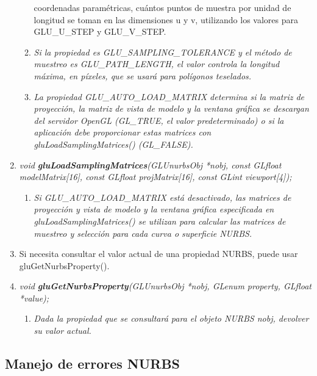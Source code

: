 \begin{enumerate}
\begin{enumerate}
{            coordenadas paramétricas, cuántos puntos de muestra por
            unidad de longitud se toman en las dimensiones u y v,
            utilizando los valores para GLU\_U\_STEP y GLU\_V\_STEP.
        }
        \item[] \textit{Si la propiedad es GLU\_SAMPLING\_TOLERANCE
            y el método de muestreo es GLU\_PATH\_LENGTH, el valor
            controla la longitud máxima, en píxeles, que se usará
            para polígonos teselados.
        }
        \item[] \textit{La propiedad GLU\_AUTO\_LOAD\_MATRIX determina
            si la matriz de proyección, la matriz de vista de modelo
            y la ventana gráfica se descargan del servidor OpenGL
            (GL\_TRUE, el valor predeterminado) o si la aplicación
            debe proporcionar estas matrices con gluLoadSamplingMatrices()
            (GL\_FALSE).
        }
    \end{enumerate}
    \item[] \emph{void \textbf{gluLoadSamplingMatrices}(GLUnurbsObj *nobj,
    const GLfloat modelMatrix[16], const GLfloat projMatrix[16],
    const GLint viewport[4]);}
        \begin{enumerate}
            \item[] \textit{Si GLU\_AUTO\_LOAD\_MATRIX está desactivado,
                las matrices de proyección y vista de modelo y la
                ventana gráfica especificada en gluLoadSamplingMatrices()
                se utilizan para calcular las matrices de muestreo y
                selección para cada curva o superficie NURBS.
            }
        \end{enumerate}
    \item[] Si necesita consultar el valor actual de una propiedad NURBS,
    puede usar gluGetNurbsProperty().
    \item[] \emph{void \textbf{gluGetNurbsProperty}(GLUnurbsObj *nobj,
    GLenum property, GLfloat *value);}
        \begin{enumerate}
            \item[] \textit{Dada la propiedad que se consultará
                para el objeto NURBS nobj, devolver su valor actual.
            }
        \end{enumerate}
\end{enumerate}

\subsection{Manejo de errores NURBS}

